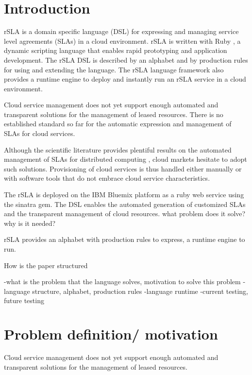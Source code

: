 \documentclass{llncs}
\begin{document}
\lstset{numbers=left, basicstyle=\small, numbersep=5pt, numberstyle=\tiny}

\section{Introduction}

rSLA is a domain specific language (DSL) for expressing and managing service level agreements (SLAs) in a cloud environment. rSLA is written with Ruby \cite{ruby}, a dynamic scripting language that enables rapid prototyping and application development. The rSLA DSL is described by an alphabet and by production rules for using and extending the language. The rSLA language framework also provides a runtime engine to deploy and instantly run an rSLA service in a cloud environment.

Cloud service management does not yet support enough automated and transparent solutions for the management of leased resources. There is no established standard so far for the automatic expression and management of SLAs for cloud services.

Although the scientific literature provides plentiful results on the automated management of SLAs for distributed computing \cite{wsla, wsag, more}, cloud markets hesitate to adopt such solutions. Provisioning of cloud services is thus handled either manually or with software tools that do not embrace cloud service characteristics.


The rSLA is deployed on the IBM Bluemix platform as a ruby web service using the sinatra gem. 
The DSL enables the automated generation of customized SLAs and the transparent management of cloud resources.
what problem does it solve? why is it needed?

rSLA provides an alphabet with production rules to express, a runtime engine to run.

How is the paper structured

-what is the problem that the language solves, motivation to solve this problem
-language structure, alphabet, production rules
-language runtime
-current testing, future testing

\section{Problem definition/ motivation}
Cloud service management does not yet support enough automated and transparent solutions for the management of leased resources. 
\end{document}
